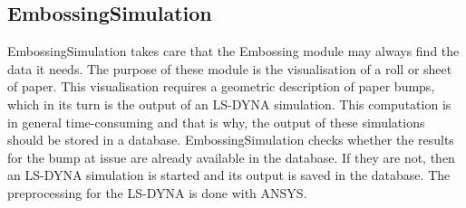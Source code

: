 \begin{htmlonly}



\startdocument
\subsection{EmbossingSimulation}
\label{EmbossingSimulation}


%
%
EmbossingSimulation takes care that the Embossing module
may always find the data it needs. The purpose of these
module is the visualisation of a roll or sheet of paper.
This visualisation requires a geometric description of
paper bumps, which in its turn is the output of an
LS-DYNA simulation. This computation is in general
time-consuming and that is why, the output of these
simulations should be stored in a database. EmbossingSimulation
checks whether the results for the bump at issue are
already available in the database. If they are not, then
an LS-DYNA simulation is started and its output is
saved in the database. The preprocessing for the LS-DYNA
is done with ANSYS.



\end{htmlonly}
